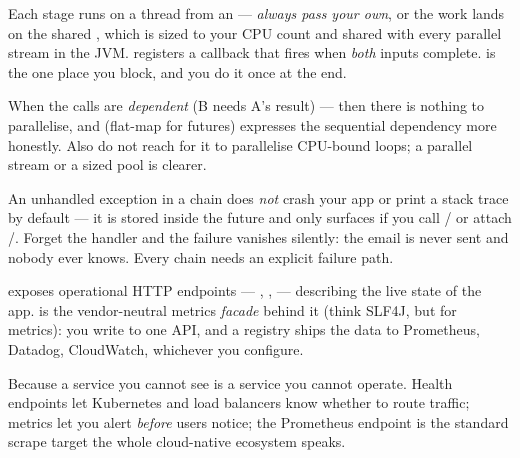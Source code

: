  Each stage runs on a thread from an  --- \emph{always pass your own}, or the work lands on the shared , which is sized to your CPU count and shared with every parallel stream in the JVM.  registers a callback that fires when \emph{both} inputs complete.  is the one place you block, and you do it once at the end.

 When the calls are \emph{dependent} (B needs A's result) --- then there is nothing to parallelise, and  (flat-map for futures) expresses the sequential dependency more honestly. Also do not reach for it to parallelise CPU-bound loops; a parallel stream or a sized pool is clearer.

\begin{misconception}
An unhandled exception in a  chain does \emph{not} crash your app or print a stack trace by default --- it is stored inside the future and only surfaces if you call / or attach /. Forget the handler and the failure vanishes silently: the email is never sent and nobody ever knows. Every chain needs an explicit failure path.
\end{misconception}


  exposes operational HTTP endpoints --- , ,  --- describing the live state of the app.  is the vendor-neutral metrics \emph{facade} behind it (think SLF4J, but for metrics): you write to one API, and a registry ships the data to Prometheus, Datadog, CloudWatch, whichever you configure.

 Because a service you cannot see is a service you cannot operate. Health endpoints let Kubernetes and load balancers know whether to route traffic; metrics let you alert \emph{before} users notice; the Prometheus endpoint is the standard scrape target the whole cloud-native ecosystem speaks.

